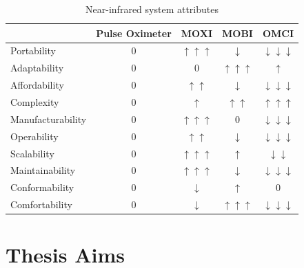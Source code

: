 \begin{table}[]
\centering
\caption{Near-infrared system attributes}
\label{tab:pughtable}
\begin{tabular}{@{}lcccc@{}}
\toprule
                  & Pulse Oximeter & MOXI                      & MOBI                      & OMCI                            \\ \midrule
Portability       & 0              & $\uparrow \uparrow \uparrow$ & $\downarrow$               & $\downarrow \downarrow \downarrow$ \\
Adaptability      & 0              & 0                         & $\uparrow \uparrow \uparrow$ & $\uparrow$                       \\
Affordability     & 0              & $\uparrow \uparrow$         & $\downarrow$               & $\downarrow \downarrow \downarrow$ \\
Complexity        & 0              & $\uparrow$                 & $\uparrow \uparrow$         & $\uparrow \uparrow \uparrow$       \\
Manufacturability & 0              & $\uparrow \uparrow \uparrow$ & 0                         & $\downarrow \downarrow \downarrow$ \\
Operability       & 0              & $\uparrow \uparrow$         & $\downarrow$               & $\downarrow \downarrow \downarrow$ \\
Scalability       & 0              & $\uparrow \uparrow \uparrow$ & $\uparrow$                 & $\downarrow \downarrow$           \\
Maintainability   & 0              & $\uparrow \uparrow \uparrow$ & $\downarrow$               & $\downarrow \downarrow \downarrow$ \\
Conformability    & 0              & $\downarrow$               & $\uparrow$                 & 0                               \\
Comfortability    & 0              & $\downarrow$               & $\uparrow \uparrow \uparrow$ & $\downarrow \downarrow \downarrow$ \\ \bottomrule
\end{tabular}
\end{table}



\section{Thesis Aims}
\label{chap:background:aims}


